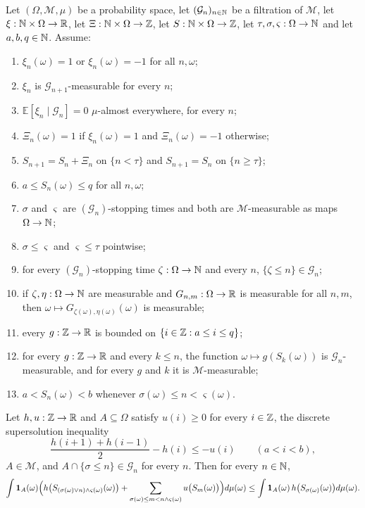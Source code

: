 \begin{lemma}
Let $(\Omega,\mathcal M,\mu)$ be a probability space, let
$(\mathcal G_n)_{n\in\mathbb{N}}$ be a filtration of $\mathcal M$, let
$\xi:\mathbb{N}\times\Omega\to\mathbb{R}$, let $\Xi:\mathbb{N}\times\Omega\to\mathbb{Z}$, let
$S:\mathbb{N}\times\Omega\to\mathbb{Z}$, let $\tau,\sigma,\varsigma:\Omega\to\mathbb{N}$ and let
$a,b,q\in\mathbb{N}$. Assume:
\begin{enumerate}
\item\label{it:slsb-pm} $\xi_n(\omega)=1$ or $\xi_n(\omega)=-1$ for all
$n,\omega$;
\item\label{it:slsb-ximeas} $\xi_n$ is $\mathcal G_{n+1}$-measurable for every
$n$;
\item\label{it:slsb-xicond} $\mathbb E[\xi_n\mid\mathcal G_n]=0$ $\mu$-almost
everywhere, for every $n$;
\item\label{it:slsb-Xi} $\Xi_n(\omega)=1$ if $\xi_n(\omega)=1$ and
$\Xi_n(\omega)=-1$ otherwise;
\item\label{it:slsb-step} $S_{n+1}=S_n+\Xi_n$ on $\{n<\tau\}$ and
$S_{n+1}=S_n$ on $\{n\ge\tau\}$;
\item\label{it:slsb-range} $a\le S_n(\omega)\le q$ for all $n,\omega$;
\item\label{it:slsb-st} $\sigma$ and $\varsigma$ are $(\mathcal G_n)$-stopping
times and both are $\mathcal M$-measurable as maps $\Omega\to\mathbb{N}$;
\item\label{it:slsb-order} $\sigma\le\varsigma$ and $\varsigma\le\tau$
pointwise;
\item\label{it:slsb-stG} for every $(\mathcal G_n)$-stopping time
$\zeta:\Omega\to\mathbb{N}$ and every $n$, $\{\zeta\le n\}\in\mathcal G_n$;
\item\label{it:slsb-idx} if $\zeta,\eta:\Omega\to\mathbb{N}$ are measurable and
$G_{n,m}:\Omega\to\mathbb{R}$ is measurable for all $n,m$, then
$\omega\mapsto G_{\zeta(\omega),\eta(\omega)}(\omega)$ is measurable;
\item\label{it:slsb-bdd} every $g:\mathbb{Z}\to\mathbb{R}$ is bounded on
$\{i\in\mathbb{Z}:a\le i\le q\}$;
\item\label{it:slsb-meas} for every $g:\mathbb{Z}\to\mathbb{R}$ and every $k\le n$, the
function $\omega\mapsto g(S_k(\omega))$ is $\mathcal G_n$-measurable, and for
every $g$ and $k$ it is $\mathcal M$-measurable;
\item\label{it:slsb-win} $a<S_n(\omega)<b$ whenever
$\sigma(\omega)\le n<\varsigma(\omega)$.
\end{enumerate}
Let $h,u:\mathbb{Z}\to\mathbb{R}$ and $A\subseteq\Omega$ satisfy $u(i)\ge0$ for every
$i\in\mathbb{Z}$, the discrete supersolution inequality
\begin{equation}\label{eq:slsb-super}
  \frac{h(i+1)+h(i-1)}{2}-h(i)\le-u(i)\qquad(a<i<b),
\end{equation}
$A\in\mathcal M$, and $A\cap\{\sigma\le n\}\in\mathcal G_n$ for every $n$. Then
for every $n\in\mathbb{N}$,
\begin{equation}\label{eq:slsb-bound}
  \int\mathbf1_A(\omega)
     \Bigl(h\bigl(S_{(\sigma(\omega)\vee n)\wedge\varsigma(\omega)}(\omega)\bigr)
       +\sum_{\sigma(\omega)\le m<n\wedge\varsigma(\omega)}
          u\bigl(S_m(\omega)\bigr)\Bigr)d\mu(\omega)
  \le\int\mathbf1_A(\omega)\,h\bigl(S_{\sigma(\omega)}(\omega)\bigr)d\mu(\omega).
\end{equation}
\end{lemma}

